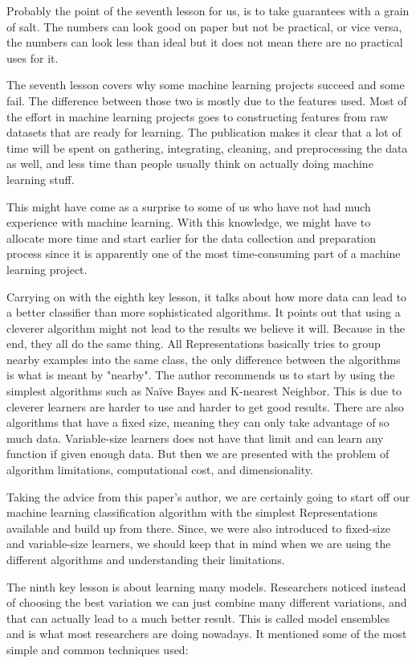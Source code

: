 \documentclass[a4paper,12pt]{report}
\begin{document}
Probably the point of the seventh lesson for us, is to take guarantees with a grain of salt. The numbers can look good on paper but not be practical, or vice versa, the numbers can look less than ideal but it does not mean there are no practical uses for it.

The seventh lesson covers why some machine learning projects succeed and some fail. The difference between those two is mostly due to the features used. Most of the effort in machine learning projects goes to constructing features from raw datasets that are ready for learning. The publication makes it clear that a lot of time will be spent on gathering, integrating, cleaning, and preprocessing the data as well, and less time than people usually think on actually doing machine learning stuff.

This might have come as a surprise to some of us who have not had much experience with machine learning. With this knowledge, we might have to allocate more time and start earlier for the data collection and preparation process since it is apparently one of the most time-consuming part of a machine learning project.

Carrying on with the eighth key lesson, it talks about how more data can lead to a better classifier than more sophisticated algorithms. It points out that using a cleverer algorithm might not lead to the results we believe it will. Because in the end, they all do the same thing. All Representations basically tries to group nearby examples into the same class, the only difference between the algorithms is what is meant by "nearby". The author recommends us to start by using the simplest algorithms such as Naïve Bayes and K-nearest Neighbor. This is due to cleverer learners are harder to use and harder to get good results. There are also algorithms that have a fixed size, meaning they can only take advantage of so much data. Variable-size learners does not have that limit and can learn any function if given enough data. But then we are presented with the problem of algorithm limitations, computational cost, and dimensionality.

Taking the advice from this paper’s author, we are certainly going to start off our machine learning classification algorithm with the simplest Representations available and build up from there. Since, we were also introduced to fixed-size and variable-size learners, we should keep that in mind when we are using the different algorithms and understanding their limitations.

The ninth key lesson is about learning many models. Researchers noticed instead of choosing the best variation we can just combine many different variations, and that can actually lead to a much better result. This is called model ensembles and is what most researchers are doing nowadays. It mentioned some of the most simple and common techniques used:
\end{document}
